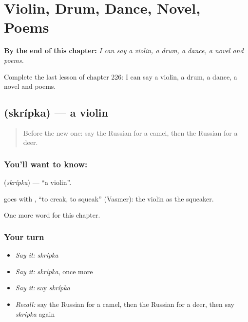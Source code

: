 
\chapter{Violin, Drum, Dance, Novel, Poems}
\label{ch:ru-violin-drum-dance-novel-poems}

\begin{chapteropening}
\textbf{By the end of this chapter:} \emph{I can say a violin, a drum, a dance, a novel and poems.}

Complete the last lesson of chapter 226: I can say a violin, a drum, a dance, a novel and poems.
\end{chapteropening}

\section[\texorpdfstring{\ru{скрипка} (skrípka)}{скрипка (skrípka)}]{ (skrípka) — a violin}

\label{lesson:RU-C226-skripka}



\begin{quote}
Before the new one: say the Russian for a camel, then the Russian for a deer.
\end{quote}

\subsection*{You'll want to know: }
\textbf{} (\emph{skrípka}) — \textquotedblleft{}a violin\textquotedblright{}.

\begin{cousinweb}
\textbf{} goes with \emph{}, \textquotedblleft{}to creak, to squeak\textquotedblright{} (Vasmer): the violin as the squeaker.
\end{cousinweb}

\begin{grammarlens}[title={What you've built}]
One more word for this chapter.
\end{grammarlens}

\subsection*{Your turn}
\begin{itemize}
\raggedright
  \item \emph{Say it:} \emph{skrípka}
  \item \emph{Say it:} \emph{skrípka}, once more
  \item \emph{Say it:} say \emph{skrípka}
  \item \emph{Recall:} say the Russian for a camel, then the Russian for a deer, then say \emph{skrípka} again
\end{itemize}

